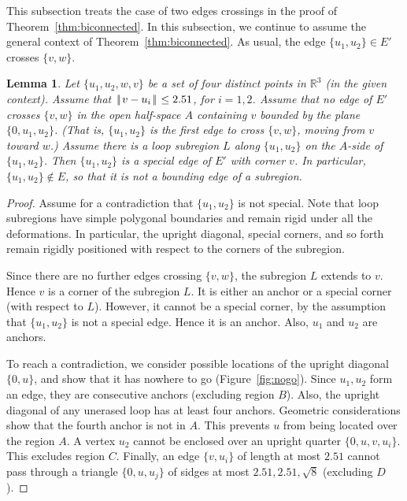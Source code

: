 \documentclass[11pt]{amsart}
\newcommand{\ring}[1]{\mathbb{#1}}
\def\|{{\hskip0.1em|\hskip-0.15em|\hskip0.1em}}
\newtheorem{lemma}{Lemma}
\begin{document}
This subsection treats the case of two edges crossings in the proof
of Theorem~\ref{thm:biconnected}.
In this subsection, we continue to assume the general context of Theorem~\ref{thm:biconnected}.  As usual, 
the edge $\{u_1,u_2\}\in E'$ crosses $\{v,w\}$.

\begin{lemma}\label{lemma:special}
Let $\{u_1,u_2,w,v\}$ be a set of four distinct points
in $\ring{R}^3$ (in the given context).  
Assume that
 $\|v-u_i\|\le 2.51$, for $i=1,2$.
Assume that no edge of $E'$ crosses $\{v,w\}$
in the open 
half-space $A$ containing $v$ bounded by the plane $\{0,u_1,u_2\}$.
(That is, $\{u_1,u_2\}$ is the first edge to cross $\{v,w\}$, moving
from $v$ toward $w$.)
Assume there is a loop subregion $L$ along 
$\{u_1,u_2\}$ on the $A$-side
of $\{u_1,u_2\}$.  Then $\{u_1,u_2\}$ is a special edge of $E'$ with
corner $v$.
In particular, $\{u_1,u_2\}\not\in E$, so that it is not a bounding
edge of a subregion.
\end{lemma}

\begin{proof}
Assume for a contradiction that $\{u_1,u_2\}$ is not special.
Note that loop subregions have simple polygonal boundaries and
remain rigid under all the deformations.  In particular,
the upright diagonal, special corners, and so forth
remain rigidly positioned with respect to the corners of the subregion.

Since there are no further edges crossing $\{v,w\}$, the subregion
$L$ extends to $v$.  Hence $v$ is a corner of the subregion $L$.
It is either an anchor or a special corner (with respect to $L$). However, it cannot be a special
corner, by the assumption that $\{u_1,u_2\}$ is not a special edge.
Hence it is an anchor.  Also, $u_1$ and $u_2$ are anchors.

To reach a contradiction, 
we consider possible locations of the upright diagonal $\{0,u\}$,
and show that it has nowhere to go (Figure~\ref{fig:nogo}).  
Since $u_1,u_2$ form an edge,
they are consecutive anchors (excluding region $B$).  
Also, the upright diagonal of any
unerased loop has at least four anchors.  Geometric considerations show that
the fourth anchor is not in $A$.  This prevents $u$ from
being located over the region $A$.
A vertex $u_2$ cannot be enclosed over an upright quarter $\{0,u,v,u_i\}$.  This excludes
 region $C$.  Finally, an edge $\{v,u_i\}$
of length at most $2.51$ cannot pass through a triangle $\{0,u,u_j\}$
of sidges at most $2.51,2.51,\sqrt8$ (excluding $D$).
\end{proof}
\end{document}
